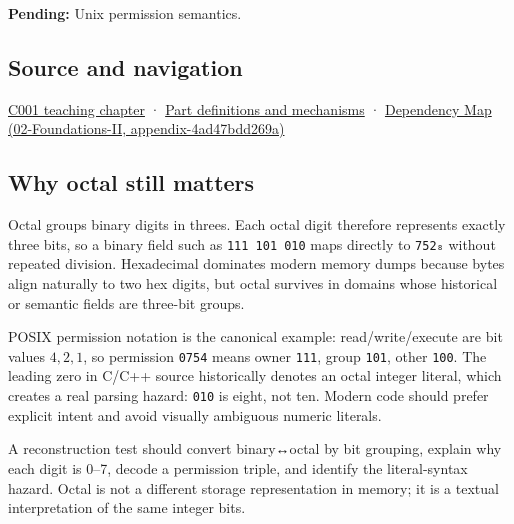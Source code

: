 \textbf{Pending:} Unix permission semantics.

\subsection{Source and navigation}\label{source-and-navigation}

\href{Continuous\%20Notes/Computing\%20Foundations\%20-\%20From\%20Bits\%20to\%20C++\%20and\%20Systems\%20APIs\#From\%20a\%20signal\%20to\%20an\%20interpretation}{C001 teaching chapter} · \hyperref[appendix-fd090d982a15]{Part definitions and mechanisms} · \href{}{Dependency Map (02-Foundations-II, appendix-4ad47bdd269a)}

\subsection{Why octal still matters}\label{why-octal-still-matters}

Octal groups binary digits in threes. Each octal digit therefore represents exactly three bits, so a binary field such as \texttt{111\ 101\ 010} maps directly to \texttt{752₈} without repeated division. Hexadecimal dominates modern memory dumps because bytes align naturally to two hex digits, but octal survives in domains whose historical or semantic fields are three-bit groups.

POSIX permission notation is the canonical example: read/write/execute are bit values \(4,2,1\), so permission \texttt{0754} means owner \texttt{111}, group \texttt{101}, other \texttt{100}. The leading zero in C/C++ source historically denotes an octal integer literal, which creates a real parsing hazard: \texttt{010} is eight, not ten. Modern code should prefer explicit intent and avoid visually ambiguous numeric literals.

A reconstruction test should convert binary↔octal by bit grouping, explain why each digit is 0--7, decode a permission triple, and identify the literal-syntax hazard. Octal is not a different storage representation in memory; it is a textual interpretation of the same integer bits.
